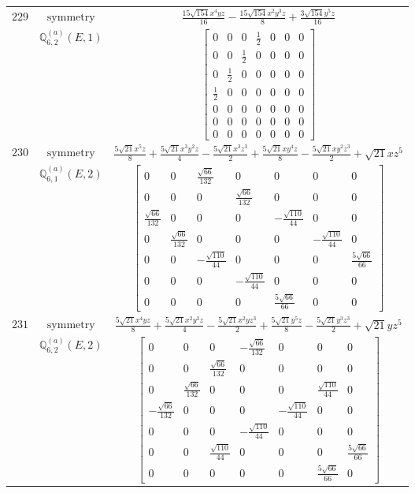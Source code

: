 \documentclass[fleqn,8pt,landscape]{jsarticle}
\begin{document}
\begin{longtable}{ccc}
$ 229 $ & $ \text{symmetry} $ & $ \frac{15 \sqrt{154} x^{4} y z}{16} - \frac{15 \sqrt{154} x^{2} y^{3} z}{8} + \frac{3 \sqrt{154} y^{5} z}{16} $ \\
$  $ & $ \mathbb{Q}_{6,2}^{(a)}(E,1) $ & $ \begin{bmatrix} 0 & 0 & 0 & \frac{1}{2} & 0 & 0 & 0 \\ 0 & 0 & \frac{1}{2} & 0 & 0 & 0 & 0 \\ 0 & \frac{1}{2} & 0 & 0 & 0 & 0 & 0 \\ \frac{1}{2} & 0 & 0 & 0 & 0 & 0 & 0 \\ 0 & 0 & 0 & 0 & 0 & 0 & 0 \\ 0 & 0 & 0 & 0 & 0 & 0 & 0 \\ 0 & 0 & 0 & 0 & 0 & 0 & 0 \end{bmatrix} $ \\ \hline
$ 230 $ & $ \text{symmetry} $ & $ \frac{5 \sqrt{21} x^{5} z}{8} + \frac{5 \sqrt{21} x^{3} y^{2} z}{4} - \frac{5 \sqrt{21} x^{3} z^{3}}{2} + \frac{5 \sqrt{21} x y^{4} z}{8} - \frac{5 \sqrt{21} x y^{2} z^{3}}{2} + \sqrt{21} x z^{5} $ \\
$  $ & $ \mathbb{Q}_{6,1}^{(a)}(E,2) $ & $ \begin{bmatrix} 0 & 0 & \frac{\sqrt{66}}{132} & 0 & 0 & 0 & 0 \\ 0 & 0 & 0 & \frac{\sqrt{66}}{132} & 0 & 0 & 0 \\ \frac{\sqrt{66}}{132} & 0 & 0 & 0 & - \frac{\sqrt{110}}{44} & 0 & 0 \\ 0 & \frac{\sqrt{66}}{132} & 0 & 0 & 0 & - \frac{\sqrt{110}}{44} & 0 \\ 0 & 0 & - \frac{\sqrt{110}}{44} & 0 & 0 & 0 & \frac{5 \sqrt{66}}{66} \\ 0 & 0 & 0 & - \frac{\sqrt{110}}{44} & 0 & 0 & 0 \\ 0 & 0 & 0 & 0 & \frac{5 \sqrt{66}}{66} & 0 & 0 \end{bmatrix} $ \\ \hline
$ 231 $ & $ \text{symmetry} $ & $ \frac{5 \sqrt{21} x^{4} y z}{8} + \frac{5 \sqrt{21} x^{2} y^{3} z}{4} - \frac{5 \sqrt{21} x^{2} y z^{3}}{2} + \frac{5 \sqrt{21} y^{5} z}{8} - \frac{5 \sqrt{21} y^{3} z^{3}}{2} + \sqrt{21} y z^{5} $ \\
$  $ & $ \mathbb{Q}_{6,2}^{(a)}(E,2) $ & $ \begin{bmatrix} 0 & 0 & 0 & - \frac{\sqrt{66}}{132} & 0 & 0 & 0 \\ 0 & 0 & \frac{\sqrt{66}}{132} & 0 & 0 & 0 & 0 \\ 0 & \frac{\sqrt{66}}{132} & 0 & 0 & 0 & \frac{\sqrt{110}}{44} & 0 \\ - \frac{\sqrt{66}}{132} & 0 & 0 & 0 & - \frac{\sqrt{110}}{44} & 0 & 0 \\ 0 & 0 & 0 & - \frac{\sqrt{110}}{44} & 0 & 0 & 0 \\ 0 & 0 & \frac{\sqrt{110}}{44} & 0 & 0 & 0 & \frac{5 \sqrt{66}}{66} \\ 0 & 0 & 0 & 0 & 0 & \frac{5 \sqrt{66}}{66} & 0 \end{bmatrix} $ \\ \hline

\end{longtable}
\end{document}
